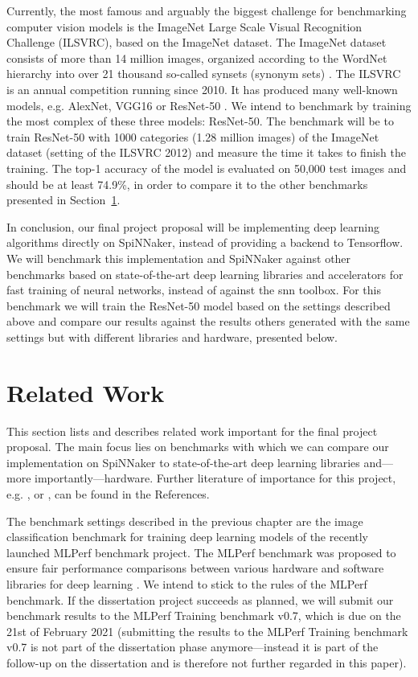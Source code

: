 \documentclass{article}
\begin{document}
Currently, the most famous and arguably the biggest challenge
for benchmarking computer vision models is the
ImageNet Large Scale Visual Recognition Challenge (ILSVRC),
based on the ImageNet dataset.
The ImageNet dataset consists of more than 14 million
images, organized according to the WordNet hierarchy into
over 21 thousand so-called synsets (synonym sets)
\citep{imagenet, wordnet}.
The ILSVRC is an annual competition running since 2010.
It has produced many well-known models, e.g. AlexNet, VGG16 or
ResNet-50 \citep{alexnet, simonyan_et_al_2014,
  he_et_al_2015}.
We intend to benchmark by training the most complex of
these three models: ResNet-50.
The benchmark will be to train ResNet-50 with 1000
categories (1.28 million images) of the ImageNet dataset
(setting of the ILSVRC 2012) and measure the time it takes
to finish the training.
The top-1 accuracy of the model is evaluated on 50,000 test
images and should be at least 74.9\%, in order to compare
it to the other benchmarks presented in
Section~\ref{sec:related_work}.

In conclusion, our final project proposal will be
implementing deep learning algorithms directly on
SpiNNaker, instead of providing a backend to Tensorflow.
We will benchmark this implementation and SpiNNaker against
other benchmarks based on state-of-the-art deep learning
libraries and accelerators for fast training of neural
networks, instead of against the snn toolbox.
For this benchmark we will train the ResNet-50 model
based on the settings described above and compare our
results against the results others generated with the same
settings but with different libraries and hardware, presented below.


\section{Related Work} %
\label{sec:related_work}

This section lists and describes related work important for the final
project proposal.
The main focus lies on benchmarks with which we can
compare our implementation on SpiNNaker to state-of-the-art
deep learning libraries and---more importantly---hardware.
Further literature of importance for this project, e.g.
\citet{he_et_al_2015}, \citet{goodfellow2016} or
\citet{imagenet}, can be found in the References.

The benchmark settings described in the previous chapter
are the image classification benchmark for training deep
learning models of the recently launched MLPerf benchmark
project.
The MLPerf benchmark was proposed to ensure fair
performance comparisons between various hardware and
software libraries for deep learning
\citep{mattson_et_al_2019}.
We intend to stick to the rules of the MLPerf benchmark.
If the dissertation project succeeds as planned, we
will submit our benchmark results to the MLPerf Training
benchmark v0.7, which is due on the 21st of February 2021
(submitting the results to the MLPerf Training benchmark
v0.7 is not part of the dissertation phase
anymore---instead it is part of the follow-up on the
dissertation and is therefore not further regarded in this
paper).
\end{document}
